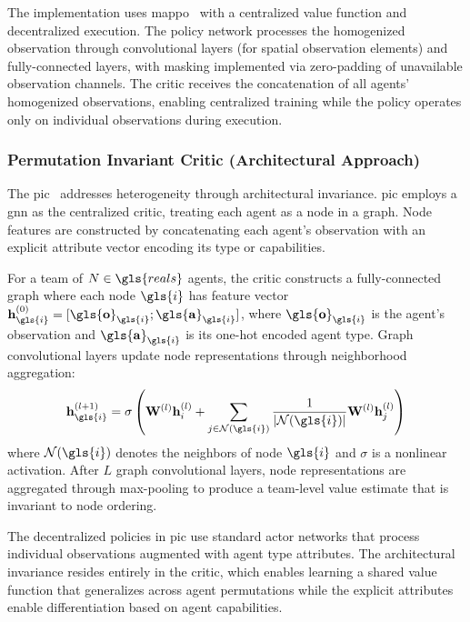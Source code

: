 \documentclass[conference]{IEEEtran}
\begin{document}
The implementation uses \gls{mappo}~\cite{yu2022} with a centralized value 
function and decentralized execution. The policy network processes the 
homogenized observation through convolutional layers (for spatial observation elements) 
and fully-connected layers, with masking implemented via zero-padding of 
unavailable observation channels. The critic receives the concatenation of all agents' 
homogenized observations, enabling centralized training while the policy 
operates only on individual observations during execution.

\subsubsection{Permutation Invariant Critic (Architectural Approach)}

The \gls{pic}~\cite{liu2020b} addresses heterogeneity through architectural invariance. 
\Gls{pic} employs a \gls{gnn} as the centralized critic, 
treating each agent as a node in a graph. 
Node features are constructed by concatenating each agent's observation 
with an explicit attribute vector encoding its type or capabilities.

For a team of \(N\in\gls{reals}\) agents, the critic constructs a 
fully-connected graph where each node \(\gls{i}\) has feature vector 
\(\mathbf{h}_{\gls{i}}^{(0)} = [\mathbf{\gls{o}}_{\gls{i}}; \mathbf{\gls{a}}_{\gls{i}}]\), 
where \(\mathbf{\gls{o}}_{\gls{i}}\) is the agent's observation and 
\(\mathbf{\gls{a}}_{\gls{i}}\) is its one-hot encoded agent type. 
Graph convolutional layers update node representations through neighborhood aggregation:
\begin{equation*}
    \mathbf{h}_{\gls{i}}^{(l+1)} 
    = \sigma\left(\mathbf{W}^{(l)}\mathbf{h}_i^{(l)} 
    + \sum_{j \in \mathcal{N}(\gls{i})} \frac{1}{|\mathcal{N}(\gls{i})|
        }\mathbf{W}^{(l)}\mathbf{h}_j^{(l)}
    \right)
\end{equation*}
where \(\mathcal{N}(\gls{i})\) denotes the neighbors of node \(\gls{i}\) and 
\(\sigma\) is a nonlinear activation. After \(L\) graph convolutional layers, 
node representations are aggregated through max-pooling to produce a 
team-level value estimate that is invariant to node ordering.

The decentralized policies in \gls{pic} use standard actor networks that process 
individual observations augmented with agent type attributes. 
The architectural invariance resides entirely in the critic,
which enables learning a shared value function that generalizes across 
agent permutations while the explicit attributes enable differentiation 
based on agent capabilities.
\end{document}
